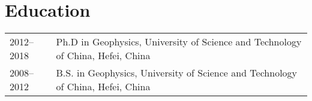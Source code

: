 \section{Education}

\begin{tabular}{p{} p{}}
2012--2018 & Ph.D in Geophysics, University of Science and Technology of China, Hefei, China \\
2008--2012 & B.S. in Geophysics, University of Science and Technology of China, Hefei, China
\end{tabular}
